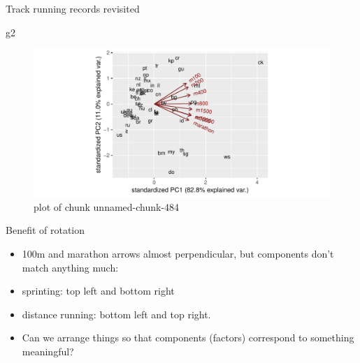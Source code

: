 \documentclass[ignorenonframetext,]{beamer}
\newenvironment{Shaded}{\begin{snugshade}}{\end{snugshade}}
\newcommand{\NormalTok}[1]{#1}
\begin{document}
\begin{frame}[fragile]{Track running records revisited}
\protect\hypertarget{track-running-records-revisited}{}

\begin{Shaded}
\begin{Highlighting}[]
\NormalTok{g2}
\end{Highlighting}
\end{Shaded}

\begin{figure}
\centering
\includegraphics{figure/unnamed-chunk-484-1.pdf}
\caption{plot of chunk unnamed-chunk-484}
\end{figure}

\end{frame}

\begin{frame}{Benefit of rotation}
\protect\hypertarget{benefit-of-rotation}{}

\begin{itemize}
\item
  100m and marathon arrows almost perpendicular, but components don't
  match anything much:
\item
  sprinting: top left and bottom right
\item
  distance running: bottom left and top right.
\item
  Can we arrange things so that components (factors) correspond to
  something meaningful?
\end{itemize}

\end{frame}
\end{document}

